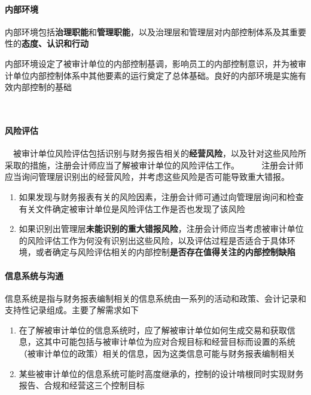 \documentclass[UTF8,12pt]{ctexart}
\numberwithin{equation}{section} %
\numberwithin{figure}{section}
\numberwithin{table}{section}
\begin{document}
	\paragraph{内部环境}
	内部环境包括\textbf{治理职能}和\textbf{管理职能}，以及治理层和管理层对内部控制体系及其重要性的\textbf{态度、认识和行动}
	
	内部环境设定了被审计单位的内部控制基调，影响员工的内部控制意识，并为被审计单位内部控制体系中其他要素的运行奠定了总体基础。良好的内部环境是实施有效内部控制的基础
	
	　\paragraph{风险评估}
	　被审计单位风险评估包括识别与财务报告相关的\textbf{经营风险}，以及针对这些风险所采取的措施，注册会计师应当了解被审计单位的风险评估工作。
	　
	　注册会计师应当询问管理层识别出的经营风险，并考虑这些风险是否可能导致重大错报。
	
	\begin{enumerate}
		\item 如果发现与财务报表有关的风险因素，注册会计师可通过向管理层询问和检查有关文件确定被审计单位是风险评估工作是否也发现了该风险
	　	
	　	\item 如果识别出管理层\textbf{未能识别的重大错报风险}，注册会计师应当考虑被审计单位的风险评估工作为何没有识别出这些风险，以及评估过程是否适合于具体环境，或者确定与风险评估相关的内部控制\textbf{是否存在值得关注的内部控制缺陷}
	　	
	\end{enumerate}
	
	\paragraph{信息系统与沟通}
	信息系统是指与财务报表编制相关的信息系统由一系列的活动和政策、会计记录和支持性记录组成。主要了解需求如下
	\begin{enumerate}
		\item 在了解被审计单位的信息系统时，应了解被审计单位如何生成交易和获取信息，这其中可能包括与被审计单位为应对合规目标和经营目标而设置的系统（被审计单位的政策）相关的信息，因为这类信息可能与财务报表编制相关
		
		\item 某些被审计单位的信息系统可能时高度继承的，控制的设计啃根同时实现财务报告、合规和经营这三个控制目标
	\end{enumerate}
	
\end{document}
